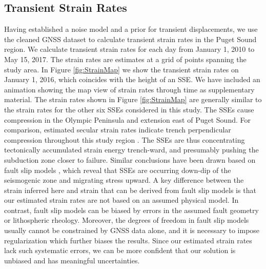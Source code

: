 \documentclass[extra,mreferee]{gji}
\begin{document}
\subsection{Transient Strain Rates}\label{sec:Results} 
Having established a noise model and a prior for transient displacements, we use the cleaned GNSS dataset to calculate transient strain rates in the Puget Sound region.  We calculate transient strain rates for each day from January 1, 2010 to May 15, 2017. The strain rates are estimates at a grid of points spanning the study area. In Figure \ref{fig:StrainMap} we show the transient strain rates on January 1, 2016, which coincides with the height of an SSE. We have included an animation showing the map view of strain rates through time as supplementary material. The strain rates shown in Figure \ref{fig:StrainMap} are generally similar to the strain rates for the other six SSEs considered in this study. The SSEs cause compression in the Olympic Peninsula and extension east of Puget Sound. For comparison, estimated secular strain rates indicate trench perpendicular compression throughout this study region \citep{Murray2000,McCaffrey2007,McCaffrey2013}. The SSEs are thus concentrating tectonically accumulated strain energy trench-ward, and presumably pushing the subduction zone closer to failure. Similar conclusions have been drawn based on fault slip models \citep[e.g.,][]{Dragert2001,Wech2009,Schmidt2010}, which reveal that SSEs are occurring down-dip of the seismogenic zone and migrating stress upward. A key difference between the strain inferred here and strain that can be derived from fault slip models is that our estimated strain rates are not based on an assumed physical model. In contrast, fault slip models can be biased by errors in the assumed fault geometry or lithospheric rheology. Moreover, the degrees of freedom in fault slip models usually cannot be constrained by GNSS data alone, and it is necessary to impose regularization which further biases the results. Since our estimated strain rates lack such systematic errors, we can be more confident that our solution is unbiased and has meaningful uncertainties.  
\end{document}

